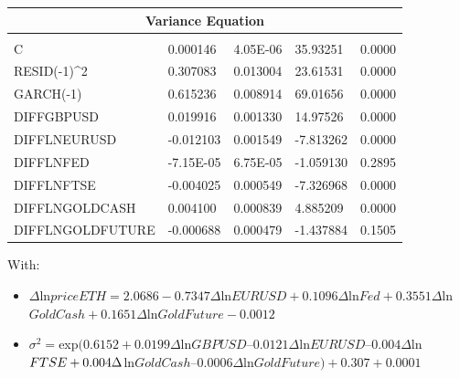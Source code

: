 \documentclass[11pt]{report}
\begin{document}
\begin{table}[!h]
\begin{tabular}{lllll}
\multicolumn{5}{|c|}{Variance Equation}                                                                                                                             \\ \hline
                               &                                  &                                 &                                  &                            \\
C                              & 0.000146                         & 4.05E-06                        & 35.93251                         & 0.0000                     \\
RESID(-1)\textasciicircum 2    & 0.307083                         & 0.013004                        & 23.61531                         & 0.0000                     \\
GARCH(-1)                      & 0.615236                         & 0.008914                        & 69.01656                         & 0.0000                     \\
DIFFGBPUSD                     & 0.019916                         & 0.001330                        & 14.97526                         & 0.0000                     \\
DIFFLNEURUSD                   & -0.012103                        & 0.001549                        & -7.813262                        & 0.0000                     \\
DIFFLNFED                      & -7.15E-05                        & 6.75E-05                        & -1.059130                        & 0.2895                     \\
DIFFLNFTSE                     & -0.004025                        & 0.000549                        & -7.326968                        & 0.0000                     \\
DIFFLNGOLDCASH                 & 0.004100                         & 0.000839                        & 4.885209                         & 0.0000                     \\
DIFFLNGOLDFUTURE               & -0.000688                        & 0.000479                        & -1.437884                        & 0.1505                    
\end{tabular}
\end{table}
\bigbreak
With: \newline
\begin{itemize}
\item $\Delta$ln$priceETH= 2.0686 - 0.7347 \Delta$ln$EURUSD + 0.1096 \Delta$ln$Fed + 0.3551 \Delta$ln$GoldCash + 0.1651 \Delta$ln$GoldFuture - 0.0012$
\item $\sigma^2=$exp$(0.6152 + 0.0199\Delta$ln$GBPUSD – 0.0121\Delta$ln$EURUSD – 0.004\Delta$ln$FTSE \\ + 0.004\Delta$ln$GoldCash – 0.0006\Delta$ln$GoldFuture) + 0.307 + 0.0001$
\end{itemize} \medbreak
\end{document}
